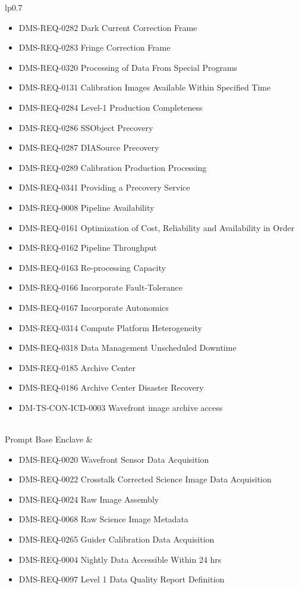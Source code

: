 \begin{xtabular}{lp{0.7\textwidth}}
\begin{itemize}
\item DMS-REQ-0282 Dark Current Correction Frame
\item DMS-REQ-0283 Fringe Correction Frame
\item DMS-REQ-0320 Processing of Data From Special Programs
\item DMS-REQ-0131 Calibration Images Available Within Specified Time
\item DMS-REQ-0284 Level-1 Production Completeness
\item DMS-REQ-0286 SSObject Precovery
\item DMS-REQ-0287 DIASource Precovery
\item DMS-REQ-0289 Calibration Production Processing
\item DMS-REQ-0341 Providing a Precovery Service
\item DMS-REQ-0008 Pipeline Availability
\item DMS-REQ-0161 Optimization of Cost, Reliability and Availability in Order
\item DMS-REQ-0162 Pipeline Throughput
\item DMS-REQ-0163 Re-processing Capacity
\item DMS-REQ-0166 Incorporate Fault-Tolerance
\item DMS-REQ-0167 Incorporate Autonomics
\item DMS-REQ-0314 Compute Platform Heterogeneity
\item DMS-REQ-0318 Data Management Unscheduled Downtime
\item DMS-REQ-0185 Archive Center
\item DMS-REQ-0186 Archive Center Disaster Recovery
\item DM-TS-CON-ICD-0003 Wavefront image archive access
\end{itemize} \\ \hline
Prompt Base Enclave &
\begin{itemize}DMS-REQ-0018 Raw Science Image Data Acquisition
\item DMS-REQ-0020 Wavefront Sensor Data Acquisition
\item DMS-REQ-0022 Crosstalk Corrected Science Image Data Acquisition
\item DMS-REQ-0024 Raw Image Assembly
\item DMS-REQ-0068 Raw Science Image Metadata
\item DMS-REQ-0265 Guider Calibration Data Acquisition
\item DMS-REQ-0004 Nightly Data Accessible Within 24 hrs
\item DMS-REQ-0097 Level 1 Data Quality Report Definition

\end{itemize}
\end{xtabular}
